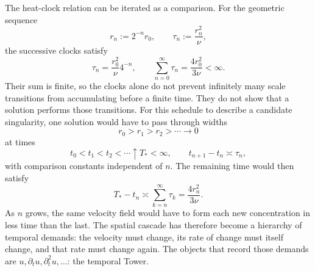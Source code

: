 The heat-clock relation can be iterated as a comparison.
For the geometric sequence
\[
  r_n:=2^{-n}r_0,
  \qquad
  \tau_n:=\frac{r_n^2}{\nu},
\]
the successive clocks satisfy
\[
  \tau_n
  =
  \frac{r_0^2}{\nu}4^{-n},
  \qquad
  \sum_{n=0}^{\infty}\tau_n
  =
  \frac{4r_0^2}{3\nu}
  <
  \infty.
\]
Their sum is finite, so the clocks alone do not prevent infinitely many scale transitions from accumulating before a finite time.
They do not show that a \NavierStokes{} solution performs those transitions.
For this schedule to describe a candidate singularity, one solution would have to pass through widths
\[
  r_0>r_1>r_2>\cdots\longrightarrow0
\]
at times
\[
  t_0<t_1<t_2<\cdots\uparrow T_*<\infty,
  \qquad
  t_{n+1}-t_n\asymp\tau_n,
\]
with comparison constants independent of \(n\).
The remaining time would then satisfy
\[
  T_*-t_n
  \asymp
  \sum_{k=n}^{\infty}\tau_k
  =
  \frac{4r_n^2}{3\nu}.
\]
As \(n\) grows, the same velocity field would have to form each new concentration in less time than the last.
The spatial cascade has therefore become a hierarchy of temporal demands: the velocity must change, its rate of change must itself change, and that rate must change again.
The objects that record those demands are \(u,\partial_tu,\partial_t^2u,\ldots\): the temporal Tower.


